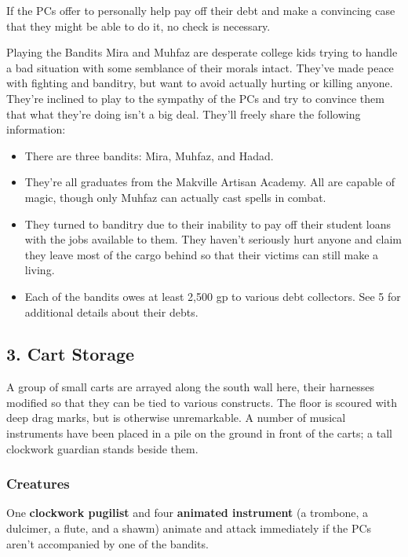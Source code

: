 \documentclass[10pt,a4paper,twoside,bg=print,twocolumn,openany,nodeprecatedcode]{dndbook}
\begin{document}
If the PCs offer to personally help pay off their debt and make a convincing case that they might be able to do it, no check is necessary.

\begin{DndSidebar}[float=!b]{Playing the Bandits}
Mira and Muhfaz are desperate college kids trying to handle a bad situation with some semblance of their morals intact. They've made peace with fighting and banditry, but want to avoid actually hurting or killing anyone. They're inclined to play to the sympathy of the PCs and try to convince them that what they're doing isn't a big deal. They'll freely share the following information:




\begin{itemize}
\item There are three bandits: Mira, Muhfaz, and Hadad.
\item They're all graduates from the Makville Artisan Academy. All are capable of magic, though only Muhfaz can actually cast spells in combat.
\item They turned to banditry due to their inability to pay off their student loans with the jobs available to them. They haven't seriously hurt anyone and claim they leave most of the cargo behind so that their victims can still make a living.
\item Each of the bandits owes at least 2,500 gp to various debt collectors. See 5 for additional details about their debts.
\end{itemize}



\end{DndSidebar}

\subsection{3. Cart Storage}
\begin{DndReadAloud}{}
A group of small carts are arrayed along the south wall here, their harnesses modified so that they can be tied to various constructs. The floor is scoured with deep drag marks, but is otherwise unremarkable. A number of musical instruments have been placed in a pile on the ground in front of the carts; a tall clockwork guardian stands beside them.

\end{DndReadAloud}

\subsubsection{Creatures}
One \textbf{clockwork pugilist} and four \textbf{animated instrument} (a trombone, a dulcimer, a flute, and a shawm) animate and attack immediately if the PCs aren't accompanied by one of the bandits.
\end{document}
